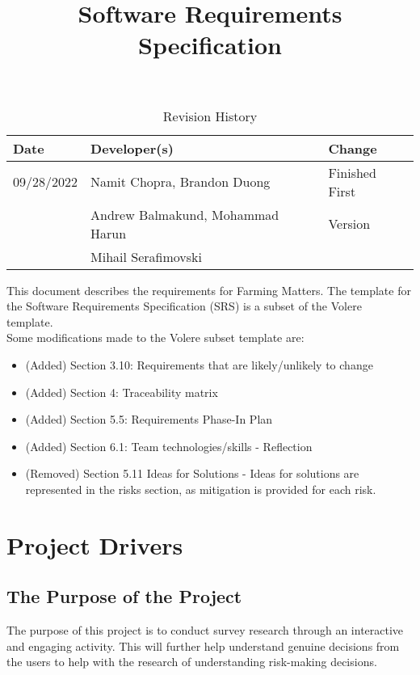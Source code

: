 \documentclass{article}
\title{Software Requirements Specification\\\progname}
\author{\authname}
\date{}
\begin{document}
\begin{table}[hp]
\caption{Revision History} \label{TblRevisionHistory}
\begin{tabularx}{\textwidth}{llX}
\toprule
\textbf{Date} & \textbf{Developer(s)} & \textbf{Change}\\
\midrule
09/28/2022 & Namit Chopra, Brandon Duong  & Finished First\\
 & Andrew Balmakund, Mohammad Harun &  Version\\
 & Mihail Serafimovski & \\
\bottomrule
\end{tabularx}
\end{table}

\newpage

\maketitle

\newpage

\tableofcontents
\listoftables
\listoffigures
\newpage


This document describes the requirements for Farming Matters. The template for the Software
Requirements Specification (SRS) is a subset of the Volere ~\citep{RobertsonAndRobertson2012} template. \newline \\ Some modifications made to the Volere subset template are:
\begin{itemize}
    \item (Added) Section 3.10: Requirements that are likely/unlikely to change
    \item (Added) Section 4: Traceability matrix
    \item (Added) Section 5.5: Requirements Phase-In Plan
    \item (Added) Section 6.1: Team technologies/skills - Reflection
    \item (Removed) Section 5.11 Ideas for Solutions - Ideas for solutions are represented in the risks section, as mitigation is provided for each risk.
\end{itemize}

\section{Project Drivers}

\subsection{The Purpose of the Project}
The purpose of this project is to conduct survey research through an interactive and engaging activity. 
This will further help understand genuine decisions from the users to help with the research of understanding risk-making decisions.
\end{document}

